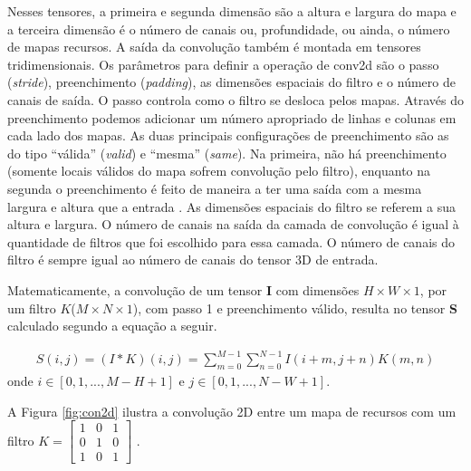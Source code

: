 Nesses tensores, a primeira e segunda dimensão são a altura e largura do mapa e a terceira dimensão é o número de canais ou, profundidade, ou ainda, o número de mapas recursos. A saída da convolução também é montada em tensores tridimensionais.
Os parâmetros para definir a operação de \acrshort{conv2d} são o passo (\textit{stride}), preenchimento (\textit{padding}), as dimensões espaciais do filtro e o número de canais de saída. O passo controla como o filtro se desloca pelos mapas. 
Através do preenchimento podemos adicionar um número apropriado de linhas e colunas em cada lado dos mapas. 
As duas principais configurações de preenchimento são as do tipo ``válida'' (\textit{valid}) e ``mesma'' (\textit{same}). Na primeira, não há preenchimento (somente locais válidos do mapa sofrem convolução pelo filtro), enquanto na segunda o preenchimento é feito de maneira a ter uma saída com a mesma largura e altura que a entrada \cite{FrancoisDeepLearning}. 
As dimensões espaciais do filtro se referem a sua altura e largura. O número de canais na saída da camada de convolução é igual à quantidade de filtros que foi escolhido para essa camada. O número de canais do filtro é sempre igual ao número de canais do tensor 3D de entrada. 

Matematicamente, a convolução de um tensor \textbf{I} com dimensões $H \times W \times 1$, por um filtro $K$($M \times N \times 1$), com passo 1 e  preenchimento válido, resulta no tensor \textbf{S} calculado segundo a equação a seguir. 

\begin{equation}
\label{eq:conv2d}
\begin{aligned}
S(i,j) = (I*K)(i,j)=  \sum_{m=0}^{M-1}\sum_{n=0}^{N-1}I(i+m,j+n)K(m,n) 
\end{aligned}
\end{equation}
\noindent onde $i \in [0,1,..., M-H+1]$ e $j \in [0,1,..., N-W+1]$. 

A Figura \ref{fig:con2d} ilustra a convolução 2D entre um mapa de recursos com um filtro $K = \begin{bmatrix}
1 &  0& 1\\ 
0 &  1& 0\\ 
1 &  0& 1
\end{bmatrix}$ .


